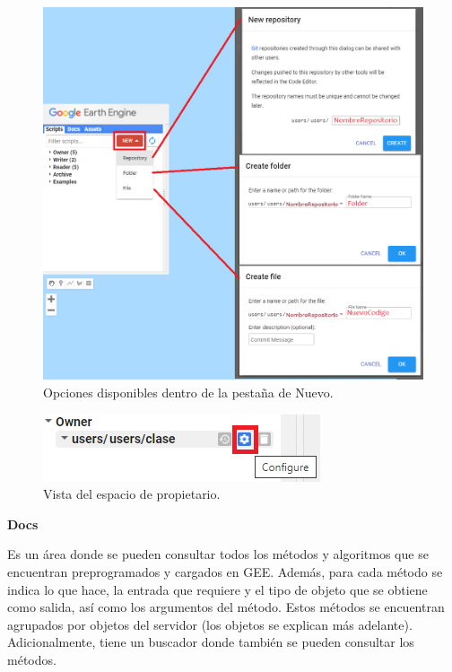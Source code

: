 \documentclass[
  12pt,
  letterpaper,
  twoside]{book}
\begin{document}
\begin{figure}

{\centering \includegraphics[width=0.8\linewidth]{Img/repofolderfile} 

}

\caption{Opciones disponibles dentro de la pestaña de Nuevo.}\label{fig:unnamed-chunk-8}
\end{figure}

\begin{figure}

{\centering \includegraphics[width=0.4\linewidth]{Img/engranaje} 

}

\caption{Vista del espacio de propietario.}\label{fig:unnamed-chunk-9}
\end{figure}

\textbf{Docs}

Es un área donde se pueden consultar todos los métodos y algoritmos que se encuentran preprogramados y cargados en GEE. Además, para cada método se indica lo que hace, la entrada que requiere y el tipo de objeto que se obtiene como salida, así como los argumentos del método. Estos métodos se encuentran agrupados por objetos del servidor (los objetos se explican más adelante). Adicionalmente, tiene un buscador donde también se pueden consultar los métodos.
\end{document}
